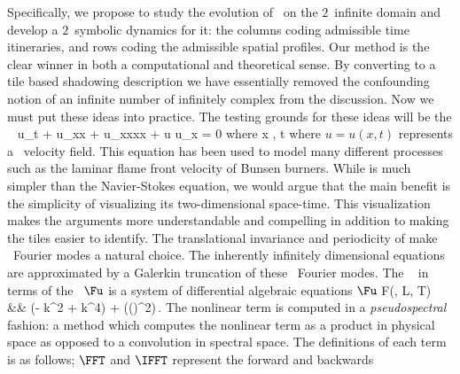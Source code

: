 Specifically, we propose to study the evolution of \KS\ on the $2$\dmn\ infinite
{\spt}domain and develop a $2$\dmn\ symbolic dynamics for it: the
columns coding admissible time itineraries, and rows coding the
admissible spatial profiles. Our {\spt} method is the clear winner in both a computational and theoretical sense. By converting to a tile based shadowing description we have essentially
removed the confounding notion of an infinite number of infinitely complex {\twots}
from the discussion. Now we must put these ideas into practice. 
The testing grounds for these ideas will be the \spt\ \KSe
\beq \label{e-ks}
u_t + u_{xx} + u_{xxxx} + u u_x = 0 \quad \mbox{where} \quad x \in [0,L], t\in [0,T]
\eeq
where $u = u(x, t)$ represents a \spt\ velocity field. This
equation has been used to model many different processes such as
the laminar flame front velocity of Bunsen burners.
While  is much simpler than the {\spt} Navier-Stokes equation,
we would argue that the main benefit is the simplicity of
visualizing its two-dimensional space-time. This visualization
makes the arguments more understandable and compelling in addition
to making the tiles easier to identify. 
The translational invariance and periodicity of  make
\spt\ Fourier modes a natural choice.
The inherently infinitely dimensional equations are approximated
by a Galerkin truncation of these \spt\ Fourier modes.
The \KSe\  in terms of the \Fcs\ $\Fu$ is a
system of differential algebraic equations
$\Fu$
\bea \label{e-kssFb}
F(\Fu, L, T) &\equiv& (\omega - k^2 + k^4) \Fu +  \FFT(\IFFT(\Fu)^2)\,.
\eea
The nonlinear term is computed in a \emph{pseudospectral} fashion: a method which computes the
nonlinear term as a product in physical space as opposed to a convolution in spectral space.
The definitions of each term is as follows; $\FFT$ and $\IFFT$ represent the forward and backwards
